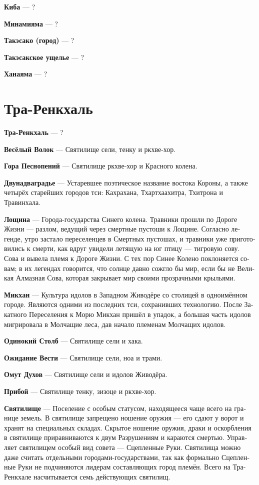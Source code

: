 \documentclass[a4paper,12pt,fleqn]{book}\usepackage{cooltooltips}\usepackage{polyglossia}\setdefaultlanguage[babelshorthands=true]{russian}\setotherlanguage{english}\defaultfontfeatures{Ligatures=TeX,Mapping=tex-text} \usepackage{xcolor}\definecolor{lightgray}{HTML}{bbbbbb}\color{lightgray}\newcommand{\ml}[3]{\textenglish{\textcolor{black}{#3}}}
\newcommand{\asterism}{\vspace{1em}{\centering\Large\bfseries$\ast~\ast~\ast$\par}\vspace{1em}}
\newcommand{\theterm}[3]{\textbf{\hypertarget{#1}{#2}} --- #3}
\begin{document}
\theterm{kiba}
{Киба}
{?}

\theterm{minamiyama}
{Минамияма}
{?}

\theterm{takesako-city}
{Такэсако (город)}
{?}

\theterm{takesako-dale}
{Такэсакское ущелье}
{?}

\theterm{hanayama}
{Ханаяма}
{?}

\section{Тра-Ренкхаль}

\theterm{tra-renkchal}
{Тра-Ренкхаль}
{?}

\asterism

\theterm{sanct3}
{Весёлый Волок}
{Святилище сели, тенку и ркхве-хор.}

\theterm{sanct6}
{Гора Песнопений}
{Святилище ркхве-хор и Красного колена.}

\theterm{two-and-two-cities}
{Двунадваградье}
{Устаревшее поэтическое название востока Короны, а также четырёх старейших городов тси: Кахрахана, Тхартхаахитра, Тхитрона и Травинхала.}

\theterm{deepdale}
{Лощина}
{Города-государства Синего колена.
Травники прошли по Дороге Жизни --- разлом, ведущий через смертные пустоши к Лощине.
Согласно легенде, утро застало переселенцев в Смертных пустошах, и травники уже приготовились к смерти, как вдруг увидели летящую на юг птицу --- тигровую сову.
Сова и вывела племя к Дороге Жизни.
С тех пор Синее Колено поклоняется совам;
в их легендах говорится, что солнце давно сожгло бы мир, если бы не Великая Алмазная Сова, которая закрывает мир своими прозрачными крыльями.}

\theterm{mikchan}
{Микхан}
{Культура идолов в Западном Живодёре со столицей в одноимённом городе.
Являются одними из последних тси, сохранивших технологию.
После Закатного Переселения к Морю Микхан пришёл в упадок, а большая часть идолов мигрировала в Молчащие леса, дав начало племенам Молчащих идолов.}

\theterm{sanct4}
{Одинокий Столб}
{Святилище сели и хака.}

\theterm{sanct5}
{Ожидание Вести}
{Святилище сели, ноа и трами.}

\theterm{sanct1}
{Омут Духов}
{Святилище сели и идолов Живодёра.}

\theterm{sanct7}
{Прибой}
{Святилище тенку, зизоце и ркхве-хор.}

\theterm{sanctuary}
{Святилище}
{Поселение с особым статусом, находящееся чаще всего на границе земель.
В святилище запрещено ношение оружия --- его сдают у ворот и хранят на специальных складах.
Скрытое ношение оружия, драки и оскорбления в святилище приравниваются к двум Разрушениям и караются смертью.
Управляет святилищем особый вид совета --- Сцепленные Руки.
Святилища можно даже считать отдельными городами-государствами, так как формально Сцепленные Руки не подчиняются лидерам составляющих город племён.
Всего на Тра-Ренкхале насчитывается семь действующих святилищ.}
\end{document}
